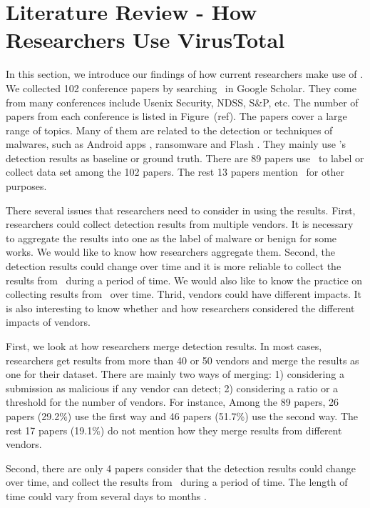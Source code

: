 \section{Literature Review - How Researchers Use VirusTotal}

In this section, we introduce our findings of how current researchers make use of \vt. We collected 102 conference papers by searching \vt\ in Google Scholar. They come from many conferences include Usenix Security, NDSS, S\&P, etc. The number of papers from each conference is listed in Figure~(ref). The papers cover a large range of topics. Many of them are related to the detection or techniques of malwares, such as Android apps \cite{arp2014drebin,huangvt2016bigdata}, ransomware \cite{kharraz2016unveil} and Flash \cite{ford2009analyzing}. They mainly use \vt's detection results as baseline or ground truth. There are 89 papers use \vt\ to label or collect data set among the 102 papers. The rest 13 papers mention \vt\ for other purposes. 

There several issues that researchers need to consider in using the results. 
First, researchers could collect detection results from multiple vendors. 
It is necessary to aggregate the results into one as the label of malware or benign for some works. We would like to know how researchers aggregate them. 
Second, the detection results could change over time and it is more reliable to collect the results from \vt\ during a period of time. We would also like to know the practice on collecting results from \vt\ over time. 
Thrid, vendors could have different impacts. It is also interesting to know whether and how researchers considered the different impacts of vendors.

First, we look at how researchers merge detection results. In most cases, researchers get results from more than 40 or 50 vendors and merge the results as one for their dataset. 
There are mainly two ways of merging: 1) considering a submission as malicious if any vendor can detect; 2) considering a ratio or a threshold for the number of vendors. 
For instance, 
Among the 89 papers, 26 papers (29.2\%) use the first way and 46 papers  (51.7\%) use the second way. The rest 17 papers (19.1\%) do not mention how they merge results from different vendors.

Second, there are only 4 papers consider that the detection results could change over time, and collect the results from \vt\ during a period of time. The length of time could vary from several days \cite{kharraz2016unveil, rajab2013camp} to months \cite{neeles, wressnegger2017looking}. 

